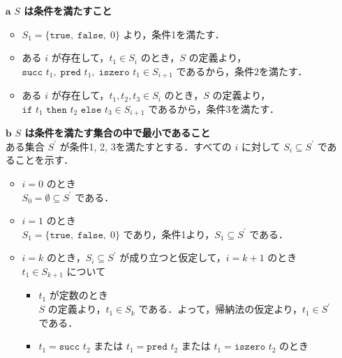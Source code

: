 \documentclass[a4paper,11pt,fleqn,dvipdfmx]{article}
\newcommand{\kakko}[1]{\raisebox{.2ex}{(}#1\raisebox{.2ex}{)}}
\begin{document}
        \begin{itemize}
            \item [\kakko{$\boldsymbol{a}$}] {\bf $S$ は条件を満たすこと}
            \begin{itemize}
                \item $S_1 = \{\texttt{true}, \; \texttt{false}, \; 0\}$ より，条件\kakko{1}を満たす．
                \item ある $i$ が存在して，$t_1 \in S_i$ のとき，$S$ の定義より， \\
                    $\texttt{succ } t_1, \; \texttt{pred } t_1, \; \texttt{iszero } t_1 \in S_{i+1}$ であるから，条件\kakko{2}を満たす．
                \item ある $i$ が存在して，$t_1, t_2, t_3 \in S_i$ のとき，$S$ の定義より， \\
                    $\texttt{if } t_1 \texttt{ then } t_2 \texttt{ else } t_3 \in S_{i+1}$ であるから，条件\kakko{3}を満たす．
            \end{itemize}
            \item [\kakko{$\boldsymbol{b}$}] {\bf $S$ は条件を満たす集合の中で最小であること} \\[2mm]
            ある集合 $S^\prime$ が条件\kakko{1}, \kakko{2}, \kakko{3}を満たすとする．すべての $i$ に対して $S_i \subseteq S^\prime$ であることを示す．
            \begin{itemize}
                \item $i=0$ のとき \\[2mm]
                    $S_0 = \emptyset \subseteq S^\prime$ である．
                \item $i=1$ のとき \\[2mm]
                    $S_1 = \{\texttt{true}, \; \texttt{false}, \; 0\}$ であり，条件\kakko{1}より，$S_1 \subseteq S^\prime$ である．
                \item $i=k$ のとき，$S_i \subseteq S^\prime$ が成り立つと仮定して，$i=k+1$ のとき \\[2mm]
                    $t_1 \in S_{k+1}$ について
                    \begin{itemize}
                        \item $t_1$ が定数のとき \\[2mm]
                            $S$ の定義より，$t_1 \in S_k$ である．よって，帰納法の仮定より，$t_1 \in S^\prime$ である．
                        \item $t_1 = \texttt{succ } t_2$ または $t_1 = \texttt{pred } t_2$ または $t_1 = \texttt{iszero } t_2$ のとき \\[2mm]

\end{itemize}
\end{itemize}
\end{itemize}
\end{document}
